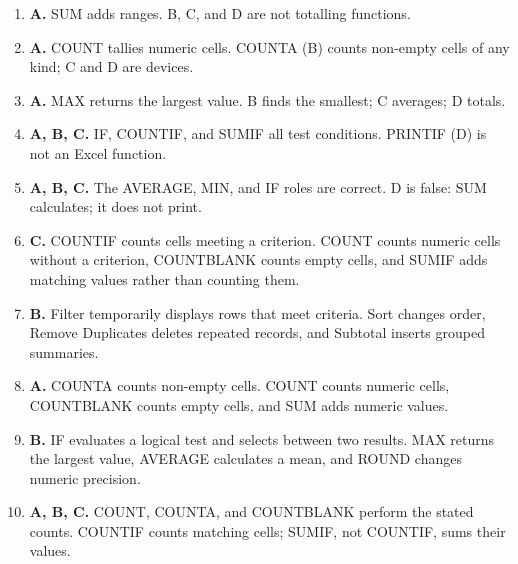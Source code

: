 \begin{enumerate}[label=\textbf{Q\arabic*.}, leftmargin=*]
\item \textbf{A.} SUM adds ranges. B, C, and D are not totalling functions.
\item \textbf{A.} COUNT tallies numeric cells. COUNTA (B) counts non-empty cells of any kind; C and D are devices.
\item \textbf{A.} MAX returns the largest value. B finds the smallest; C averages; D totals.
\item \textbf{A, B, C.} IF, COUNTIF, and SUMIF all test conditions. PRINTIF (D) is not an Excel function.
\item \textbf{A, B, C.} The AVERAGE, MIN, and IF roles are correct. D is false: SUM calculates; it does not print.
\item \textbf{C.} COUNTIF counts cells meeting a criterion. COUNT counts numeric cells
  without a criterion, COUNTBLANK counts empty cells, and SUMIF adds matching
  values rather than counting them.

\item \textbf{B.} Filter temporarily displays rows that meet criteria. Sort changes order,
  Remove Duplicates deletes repeated records, and Subtotal inserts grouped
  summaries.

\item \textbf{A.} COUNTA counts non-empty cells. COUNT counts numeric cells, COUNTBLANK
  counts empty cells, and SUM adds numeric values.

\item \textbf{B.} IF evaluates a logical test and selects between two results. MAX returns
  the largest value, AVERAGE calculates a mean, and ROUND changes numeric
  precision.

\item \textbf{A, B, C.} COUNT, COUNTA, and COUNTBLANK perform the stated counts. COUNTIF
  counts matching cells; SUMIF, not COUNTIF, sums their values.

\end{enumerate}
